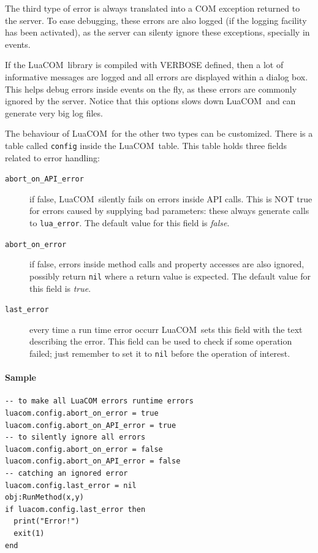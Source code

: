 \documentclass[11pt,a4paper,english]{report}
\newcommand{\ttext}[1]{#1}
\newcommand{\ttext}[1]{{\raggedright #1 \\}}
\newcommand{\ident}[1]{\mbox{\texttt{#1}}}
\newcommand{\techname}[1]{\mbox{#1}}
\newcommand{\luacom}{\techname{LuaCOM}}
\begin{document}
The third type of error is always translated into a COM exception
returned to the server. To ease debugging, these errors are also
logged (if the logging facility has been activated), as the server can
silenty ignore these exceptions, specially in events.

If the \luacom\ library is compiled with \ttext{VERBOSE} defined, then
a lot of informative messages are logged and all errors are displayed
within a dialog box. This helps debug errors inside events on the fly,
as these errors are commonly ignored by the server. Notice that this
options slows down \luacom\ and can generate very big log files.

The behaviour of \luacom\ for the other two types can be
customized. There is a table called \ident{config} inside the \luacom\
table. This table holds three fields related to error handling:

\begin{description}

\item[\ident{abort\_on\_API\_error}] if false, \luacom\ silently
fails on errors inside API calls. This is NOT true for errors caused
by supplying bad parameters: these always generate calls to
\verb+lua_error+. The default value for this field is \emph{false}.

\item[\ident{abort\_on\_error}] if false, errors inside method calls
and property accesses are also ignored, possibly return \verb+nil+
where a return value is expected. The default value for this field is
\emph{true}.

\item[\ident{last\_error}] every time a run time error occurr \luacom\
sets this field with the text describing the error. This field can be
used to check if some operation failed; just remember to set it to
\ident{nil} before the operation of interest.

\end{description}

\paragraph{Sample}

\begin{verbatim}
-- to make all LuaCOM errors runtime errors
luacom.config.abort_on_error = true
luacom.config.abort_on_API_error = true
-- to silently ignore all errors
luacom.config.abort_on_error = false
luacom.config.abort_on_API_error = false
-- catching an ignored error
luacom.config.last_error = nil
obj:RunMethod(x,y)
if luacom.config.last_error then
  print("Error!")
  exit(1)
end
\end{verbatim}
\end{document}
